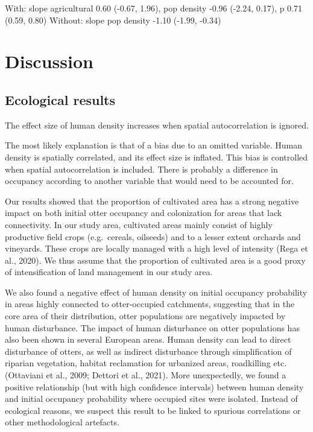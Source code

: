 \documentclass[
  11pt,
  a4paper,
]{article}
\begin{document}
With: slope agricultural 0.60 (-0.67, 1.96), pop density -0.96 (-2.24, 0.17), p 0.71 (0.59, 0.80)
Without: slope pop density -1.10 (-1.99, -0.34)

\section{Discussion}\label{discussion}

\subsection{Ecological results}\label{ecological-results}

The effect size of human density increases when spatial autocorrelation is ignored.

The most likely explanation is that of a bias due to an omitted variable.
Human density is spatially correlated, and its effect size is inflated.
This bias is controlled when spatial autocorrelation is included.
There is probably a difference in occupancy according to another variable that would need to be accounted for.

Our results showed that the proportion of cultivated area has a strong negative impact on both initial otter occupancy and colonization for areas that lack connectivity. In our study area, cultivated areas mainly consist of highly productive field crops (e.g.~cereals, oilseeds) and to a lesser extent orchards and vineyards. These crops are locally managed with a high level of intensity (Rega et al., 2020). We thus assume that the proportion of cultivated area is a good proxy of intensification of land management in our study area.

We also found a negative effect of human density on initial occupancy probability in areas highly connected to otter-occupied catchments, suggesting that in the core area of their distribution, otter populations are negatively impacted by human disturbance. The impact of human disturbance on otter populations has also been shown in several European areas. Human density can lead to direct disturbance of otters, as well as indirect disturbance through simplification of riparian vegetation, habitat reclamation for urbanized areas, roadkilling etc. (Ottaviani et al., 2009; Dettori et al., 2021). More unexpectedly, we found a positive relationship (but with high confidence intervals) between human density and initial occupancy probability where occupied sites were isolated. Instead of ecological reasons, we suspect this result to be linked to spurious correlations or other methodological artefacts.
\end{document}
